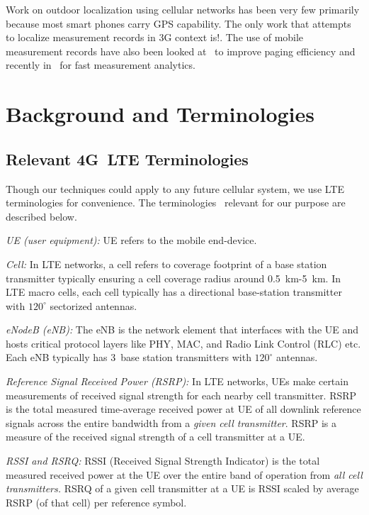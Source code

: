 \documentclass[conference, 10pt]{IEEEtran}
\begin{document}
Work on outdoor localization using cellular networks has been very few primarily
because most smart phones carry GPS capability. The only work that attempts to
localize measurement records in 3G context is!\cite{Flananghan07PCMD}. The use of
mobile measurement records have also been looked at~\cite{Zang07miningcall} to
improve paging efficiency and recently in~\cite{lipcmd} for fast measurement
analytics. 


\section{Background and Terminologies}
\label{sec:bg}

\subsection{Relevant 4G~LTE Terminologies}

Though our techniques could apply to any future cellular system, we use LTE
terminologies for convenience. The terminologies~\cite{ltebook} relevant for our purpose are
described below.

{\em UE (user equipment):} UE refers to the mobile end-device.

{\em Cell:} In LTE networks, a cell refers to coverage footprint of a base station
transmitter typically ensuring a cell coverage radius around 0.5~km-5~km.  In LTE
macro cells, each cell typically has a directional base-station transmitter with
$120^\circ$ sectorized antennas.

{\em eNodeB (eNB):} The eNB is the network element that interfaces with the UE and
hosts critical protocol layers like PHY, MAC, and Radio Link Control (RLC) etc. Each
eNB typically has 3~base station transmitters with $120^\circ$ antennas.

{\em Reference Signal Received Power (RSRP):} In LTE networks, UEs make certain
measurements of received signal strength for each nearby cell transmitter. RSRP is
the total measured time-average received power at UE of all downlink reference
signals across the entire bandwidth from a {\em given cell transmitter}. RSRP is a
measure of the received signal strength of a cell transmitter at a UE.

{\em RSSI and RSRQ:} RSSI (Received Signal Strength Indicator) is the total measured
received power at the UE over the entire band of operation from {\em all cell
transmitters.} RSRQ of a given cell transmitter at a UE is RSSI scaled by average
RSRP (of that cell) per reference symbol.
\end{document}

